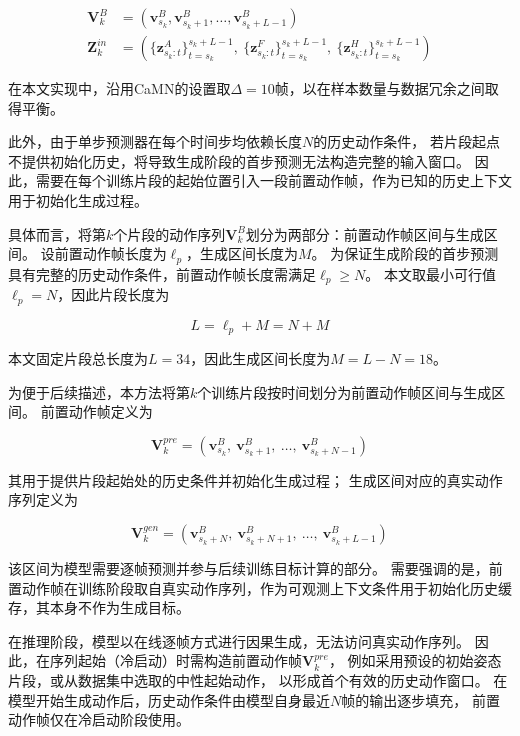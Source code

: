 \begin{align}
\bm{V}_k^B &= (\bm{v}_{s_k}^B, \bm{v}_{s_k+1}^B, \ldots, \bm{v}_{s_k+L-1}^B)\\
\bm{Z}^{in}_k &= \left(\{ \bm{z}_{s_k:t}^A \}_{t=s_k}^{s_k+L-1},\ \{ \bm{z}_{s_k:t}^F \}_{t=s_k}^{s_k+L-1},\ \{ \bm{z}_{s_k:t}^H \}_{t=s_k}^{s_k+L-1}\right)
\label{eq:segment_definition_prefix}
\end{align}

在本文实现中，沿用CaMN的设置取$\Delta=10$帧，以在样本数量与数据冗余之间取得平衡。

此外，由于单步预测器在每个时间步均依赖长度$N$的历史动作条件，
若片段起点不提供初始化历史，将导致生成阶段的首步预测无法构造完整的输入窗口。
因此，需要在每个训练片段的起始位置引入一段前置动作帧，作为已知的历史上下文用于初始化生成过程。

具体而言，将第$k$个片段的动作序列$\bm{V}_k^B$划分为两部分：前置动作帧区间与生成区间。
设前置动作帧长度为$\ell_p$，生成区间长度为$M$。
为保证生成阶段的首步预测具有完整的历史动作条件，前置动作帧长度需满足$\ell_p \ge N$。
本文取最小可行值$\ell_p = N$，因此片段长度为

\begin{equation}
L=\ell_p+M=N+M
\label{eq:segment_length_prefix}
\end{equation}

本文固定片段总长度为$L=34$，因此生成区间长度为$M=L-N=18$。

为便于后续描述，本方法将第$k$个训练片段按时间划分为前置动作帧区间与生成区间。
前置动作帧定义为

\begin{equation}
\bm{V}_k^{pre}
=
(\bm{v}_{s_k}^B,\ \bm{v}_{s_k+1}^B,\ \ldots,\ \bm{v}_{s_k+N-1}^B)
\label{eq:pre_segment_def}
\end{equation}

其用于提供片段起始处的历史条件并初始化生成过程；
生成区间对应的真实动作序列定义为

\begin{equation}
\bm{V}_k^{gen}
=
(\bm{v}_{s_k+N}^B,\ \bm{v}_{s_k+N+1}^B,\ \ldots,\ \bm{v}_{s_k+L-1}^B)
\label{eq:gt_gen_segment_def}
\end{equation}

该区间为模型需要逐帧预测并参与后续训练目标计算的部分。
需要强调的是，前置动作帧在训练阶段取自真实动作序列，作为可观测上下文条件用于初始化历史缓存，其本身不作为生成目标。

在推理阶段，模型以在线逐帧方式进行因果生成，无法访问真实动作序列。
因此，在序列起始（冷启动）时需构造前置动作帧$\bm{V}_k^{pre}$，
例如采用预设的初始姿态片段，或从数据集中选取的中性起始动作，
以形成首个有效的历史动作窗口。
在模型开始生成动作后，历史动作条件由模型自身最近$N$帧的输出逐步填充，
前置动作帧仅在冷启动阶段使用。

